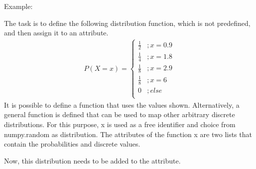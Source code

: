 \documentclass[letterpaper,10pt,english]{sphinxmanual}
\begin{document}
\sphinxAtStartPar
Example:

\sphinxAtStartPar
The task is to define the following distribution function, which is not predefined, and then assign it to an attribute.
\begin{equation*}
\begin{split}P(X=x) = \left\{\begin{array}{ll} \frac{1}{2} & ;x=0.9 \\
                     \frac{1}{4} & ;x=1.8 \\
         \frac{1}{8} & ;x=2.9 \\
         \frac{1}{8} & ;x=6 \\
         0 & ;else\\
         \end{array}\right.\end{split}
\end{equation*}
\sphinxAtStartPar
It is possible to define a function that uses the values shown. Alternatively, a general function is defined that can be
used to map other arbitrary discrete distributions. For this purpose, x is used as a free identifier and choice from
numpy.random as distribution. The attributes of the function x are two lists that contain the probabilities and discrete
values.

\begin{sphinxVerbatim}[commandchars=\\\{\}]
   

    \PYG{p}{[} \PYG{p}{]}
     
\end{sphinxVerbatim}

\sphinxAtStartPar
Now, this distribution needs to be added to the attribute.

\begin{sphinxVerbatim}[commandchars=\\\{\}]
 \PYG{p}{[}\PYG{p}{,[}\PYG{p}{],[}\PYG{p}{]]}
\end{sphinxVerbatim}
\end{document}
